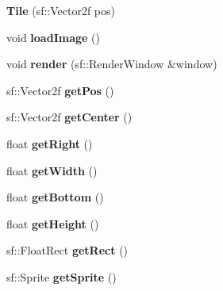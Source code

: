 \begin{DoxyCompactItemize}
\item 
\mbox{\label{class_tile_aa725e7733d68aa1bff21e5478e7a4657}} 
{\bfseries Tile} (sf\+::\+Vector2f pos)
\item 
\mbox{\label{class_tile_a75f7d0d215ea908c553b24fa0d3621d4}} 
void {\bfseries load\+Image} ()
\item 
\mbox{\label{class_tile_a57444de210a362d359197d5a6b5e16e9}} 
void {\bfseries render} (sf\+::\+Render\+Window \&window)
\item 
\mbox{\label{class_tile_ae2e177d16e7d6268c0858d660b5784f4}} 
sf\+::\+Vector2f {\bfseries get\+Pos} ()
\item 
\mbox{\label{class_tile_a8d2243b5b2ae8ca6305aae05f709c09b}} 
sf\+::\+Vector2f {\bfseries get\+Center} ()
\item 
\mbox{\label{class_tile_a0900b10be1e58a6edefefdeb8ac495dc}} 
float {\bfseries get\+Right} ()
\item 
\mbox{\label{class_tile_aa5dd2afb7ecead62f1553ef90eb45c8b}} 
float {\bfseries get\+Width} ()
\item 
\mbox{\label{class_tile_abe606f06c3d9bbb78eeb6c24f029695e}} 
float {\bfseries get\+Bottom} ()
\item 
\mbox{\label{class_tile_a5411a2b368fe4eb206cb13d97642c764}} 
float {\bfseries get\+Height} ()
\item 
\mbox{\label{class_tile_a16069b420eef8311589ade1eca42ed64}} 
sf\+::\+Float\+Rect {\bfseries get\+Rect} ()
\item 
\mbox{\label{class_tile_af3dec632de42f9e9784af0dce462837c}} 
sf\+::\+Sprite {\bfseries get\+Sprite} ()
\end{DoxyCompactItemize}
